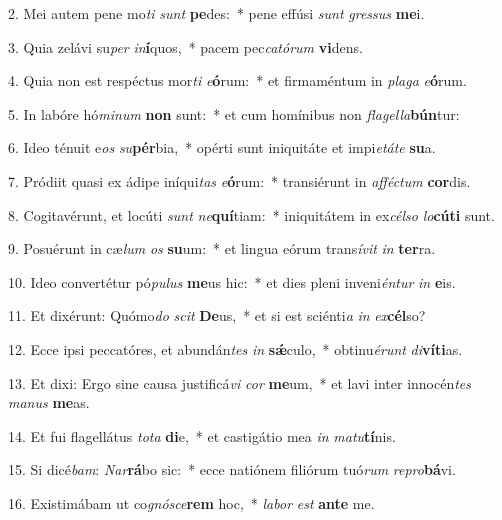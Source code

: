 2. Mei autem pene mo\textit{ti} \textit{sunt} \textbf{pe}des:~*  pene effúsi \textit{sunt} \textit{gres}\textit{sus} \textbf{me}i.\

3. Quia zelávi su\textit{per} \textit{in}\textbf{í}quos,~*  pacem pec\textit{ca}\textit{tó}\textit{rum} \textbf{vi}dens.\

4. Quia non est respéctus mor\textit{ti} \textit{e}\textbf{ó}rum:~*  et firmaméntum in \textit{pla}\textit{ga} \textit{e}\textbf{ó}rum.\

5. In labóre hó\textit{mi}\textit{num} \textbf{non} sunt:~*  et cum homínibus non \textit{fla}\textit{gel}\textit{la}\textbf{bún}tur:\

6. Ideo ténuit e\textit{os} \textit{su}\textbf{pér}bia,~*  opérti sunt iniquitáte et impi\textit{e}\textit{tá}\textit{te} \textbf{su}a.\

7. Pródiit quasi ex ádipe iníqui\textit{tas} \textit{e}\textbf{ó}rum:~*  transiérunt in \textit{af}\textit{féc}\textit{tum} \textbf{cor}dis.\

8. Cogitavérunt, et locúti \textit{sunt} \textit{ne}\textbf{quí}tiam:~*  iniquitátem in ex\textit{cél}\textit{so} \textit{lo}\textbf{cú}\textbf{ti} sunt.\

9. Posuérunt in cæ\textit{lum} \textit{os} \textbf{su}um:~*  et lingua eórum trans\textit{í}\textit{vit} \textit{in} \textbf{ter}ra.\

10. Ideo convertétur pó\textit{pu}\textit{lus} \textbf{me}us hic:~*  et dies pleni inveni\textit{én}\textit{tur} \textit{in} \textbf{e}is.\

11. Et dixérunt: Quómo\textit{do} \textit{scit} \textbf{De}us,~*  et si est sciénti\textit{a} \textit{in} \textit{ex}\textbf{cél}so?\

12. Ecce ipsi peccatóres, et abundán\textit{tes} \textit{in} \textbf{sǽ}culo,~*  obtinu\textit{é}\textit{runt} \textit{di}\textbf{ví}\textbf{ti}as.\

13. Et dixi: Ergo sine causa justificá\textit{vi} \textit{cor} \textbf{me}um,~*  et lavi inter innocén\textit{tes} \textit{ma}\textit{nus} \textbf{me}as.\

14. Et fui flagellátus \textit{to}\textit{ta} \textbf{di}e,~*  et castigátio mea \textit{in} \textit{ma}\textit{tu}\textbf{tí}nis.\

15. Si dicé\textit{bam}: \textit{Nar}\textbf{rá}bo sic:~*  ecce natiónem filiórum tuó\textit{rum} \textit{re}\textit{pro}\textbf{bá}vi.\

16. Existimábam ut co\textit{gnó}\textit{sce}\textbf{rem} hoc,~*  \textit{la}\textit{bor} \textit{est} \textbf{an}\textbf{te} me.\

